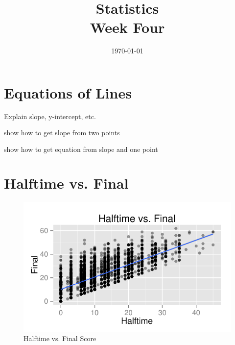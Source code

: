 \documentclass[landscape]{exam}
\title{Statistics \\ Week Four}
\date{\today}
\author{}
\begin{document}
\maketitle
\tableofcontents

  \section{Equations of Lines}
  \begin{itemize*}
    \item Explain slope, y-intercept, etc.
    \item show how to get slope from two points
    \item show how to get equation from slope and one point
  \end{itemize*}

  \section{Halftime vs. Final}

  \begin{figure}[H]
    \centering
    \includegraphics{figures/nfl/ht_vs_final.pdf}
    \caption{Halftime vs. Final Score}
  \end{figure}

\end{document}
